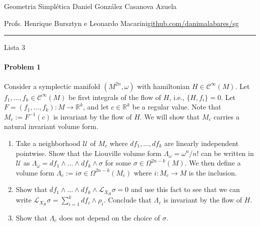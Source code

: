 

%



\begin{minipage}{\textwidth}
	\begin{minipage}{1\textwidth}
		Geometria Simpl\'etica \hfill Daniel González Casanova Azuela
		
		{\small Profs. Henrique Bursztyn e Leonardo Macarini\hfill\href{https://github.com/danimalabares/sg}{github.com/danimalabares/sg}}
	\end{minipage}
\end{minipage}\vspace{.2cm}\hrule

\vspace{10pt}
{\huge Lista 3}

\tableofcontents

\paragraph{Problem 1} Consider a symplectic manifold $(M^{2n},\omega)$ with hamiltonian $H\in\mathcal{C}^\infty(M)$. Let $f_1,\ldots,f_k\in\mathcal{C}^\infty(M)$ be first integrals of the flow of $H$, i.e., $\{H,f_i\} =0$. Let $F=(f_1,\ldots,f_k):M\longrightarrow \mathbb{R}^{k}$, and let $c \in\mathbb{R}^{k}$ be a regular value. Note that $M_c:=F^{-1}(c)$ is invariant by the flow of $H$. We will show that  $M_c$ carries a natural invariant volume form.
\begin{enumerate}[label=\alph*.]
	\item Take a neighborhood $\mathcal{U}$ of $M_{c}$ where $df_1,\ldots,df_k$ are linearly independent pointwise. Show that the Liouville volume form $\Lambda_\omega=\omega^n/n!$ can be written in $\mathcal{U}$ as $\Lambda_\omega=df_1\wedge \ldots \wedge df_k\wedge \sigma$ for some $\sigma\in\Omega^{2n-k}(M)$. We then define a volume form $\Lambda_c:= i\sigma\in\Omega^{2n-k}(M_c)$ where $i:M_c\to M$ is the inclusion.
	\item Show that $df_1\wedge \ldots \wedge df_k\wedge  \mathcal{L}_{X_H}\sigma=0$ and use this fact to see that we can write $\mathcal{L}_{X_H}\sigma=\sum_{i=1}^kdf_i\wedge \rho_i$. Conclude that $\Lambda_c$ is invariant by the flow of $H$.
	 \item Show that $\Lambda_c$ does not depend on the choice of $\sigma$.
\end{enumerate}

